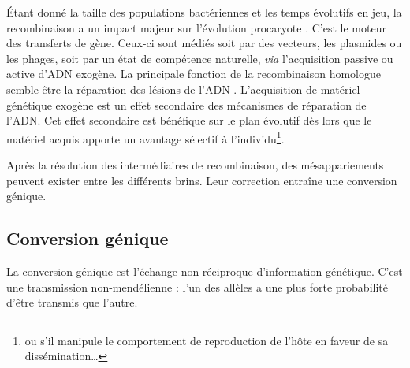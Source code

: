 \documentclass[11pt, oneside]{scrartcl}
\begin{document}
Étant donné la taille des populations bactériennes et les temps évolutifs en
jeu, la recombinaison a un impact majeur sur l'évolution procaryote
\cite{didelot_impact_2010}. C'est le moteur des transferts de gène. Ceux-ci sont
médiés soit par des vecteurs, les plasmides ou les phages, soit par un état de
compétence naturelle, \emph{via} l'acquisition passive ou active d'ADN exogène. La
principale fonction de la recombinaison homologue semble être la réparation
des lésions de l'ADN \cite{fall_horizontal_2007}. L'acquisition de matériel
génétique exogène est un effet secondaire des mécanismes de réparation de l'ADN.
Cet effet secondaire est bénéfique sur le plan évolutif dès lors que le matériel
acquis apporte un avantage sélectif à l'individu\footnote{ou s'il manipule le
comportement de reproduction de l'hôte en faveur de sa dissémination…}.

\begin{transition}
Après la résolution des intermédiaires de recombinaison, des mésappariements
peuvent exister entre les différents brins. Leur correction entraîne une
conversion génique.
\end{transition}


\subsection{Conversion génique}
\label{sec:orgheadline6}

La conversion génique est l'échange non réciproque d'information génétique.
C'est une transmission non-mendélienne : l'un des allèles a une plus forte
probabilité d'être transmis que l'autre\cite{chen_gene_2007}. 
\end{document}
